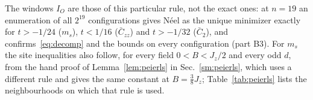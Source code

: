 \documentclass[aps,prx,onecolumn,10pt,nofootinbib,longbibliography,floatfix]{revtex4-2}
\theoremstyle{remark}
\newcommand{\Jz}{J_z}
\newcommand{\ms}{m_s}
\newcommand{\Czz}{\bar C_{zz}}
\newcommand{\Ctwo}{\bar C_{2}}
\begin{document}
The windows $I_O$ are those of this particular rule, not the exact ones: at $n=19$ an enumeration of all $2^{19}$ %
configurations gives N\'eel as the unique minimizer exactly for $t>-1/24$ ($\ms$), $t<1/16$ ($\Czz$) and %
$t>-1/32$ ($\Ctwo$), and confirms~\eqref{eq:decomp} and the bounds on every configuration (part B3). %
For $\ms$ the site inequalities also follow, for every field $0<B<\Jz/2$ and every odd $d$, from the hand proof of
Lemma~\ref{lem:peierls} in Sec.~\ref{sm:peierls}, which uses a different rule and gives the same constant at %
$B=\frac38\Jz$; Table~\ref{tab:peierls} lists the neighbourhoods on which that rule is used.
\end{document}
